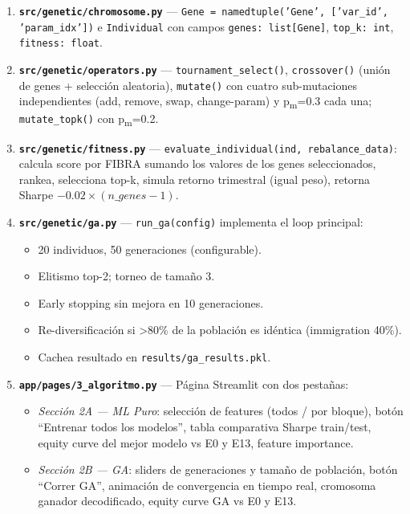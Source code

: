 \documentclass[12pt, a4paper]{article}
\begin{document}
\begin{enumerate}
  \item \textbf{\texttt{src/genetic/chromosome.py}} --- \texttt{Gene = namedtuple('Gene', ['var\_id', 'param\_idx'])} e \texttt{Individual} con campos \texttt{genes: list[Gene]}, \texttt{top\_k: int}, \texttt{fitness: float}.

  \item \textbf{\texttt{src/genetic/operators.py}} --- \texttt{tournament\_select()}, \texttt{crossover()} (uni\'{o}n de genes + selecci\'{o}n aleatoria), \texttt{mutate()} con cuatro sub-mutaciones independientes (add, remove, swap, change-param) y p\textsubscript{m}=0.3 cada una; \texttt{mutate\_topk()} con p\textsubscript{m}=0.2.

  \item \textbf{\texttt{src/genetic/fitness.py}} --- \texttt{evaluate\_individual(ind, rebalance\_data)}: calcula score por FIBRA sumando los valores de los genes seleccionados, rankea, selecciona top-k, simula retorno trimestral (igual peso), retorna Sharpe $- 0.02 \times (n\_genes - 1)$.

  \item \textbf{\texttt{src/genetic/ga.py}} --- \texttt{run\_ga(config)} implementa el loop principal:
    \begin{itemize}
      \item 20 individuos, 50 generaciones (configurable).
      \item Elitismo top-2; torneo de tama\~{n}o 3.
      \item Early stopping sin mejora en 10 generaciones.
      \item Re-diversificaci\'{o}n si >80\% de la poblaci\'{o}n es id\'{e}ntica (immigration 40\%).
      \item Cachea resultado en \texttt{results/ga\_results.pkl}.
    \end{itemize}

  \item \textbf{\texttt{app/pages/3\_algoritmo.py}} --- P\'{a}gina Streamlit con dos pesta\~{n}as:
    \begin{itemize}
      \item \textit{Secci\'{o}n 2A --- ML Puro}: selecci\'{o}n de features (todos / por bloque), bot\'{o}n ``Entrenar todos los modelos'', tabla comparativa Sharpe train/test, equity curve del mejor modelo vs E0 y E13, feature importance.
      \item \textit{Secci\'{o}n 2B --- GA}: sliders de generaciones y tama\~{n}o de poblaci\'{o}n, bot\'{o}n ``Correr GA'', animaci\'{o}n de convergencia en tiempo real, cromosoma ganador decodificado, equity curve GA vs E0 y E13.
    \end{itemize}

\end{enumerate}
\end{document}

